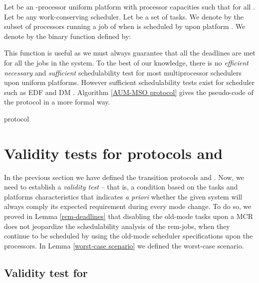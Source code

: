 \documentclass[10pt,english,a4paper]{article}
\newtheorem{validity test}{Validity Test}
\begin{document}
Let  be an -processor uniform platform with processor capacities such that  for all . Let  be any work-conserving  scheduler. Let  be a set of tasks. 
We denote by  the subset of processors running a job of  when  is scheduled by  upon platform . 
We denote by  the binary function defined by:

This function is useful as we must always guarantee that all the deadlines are met for all the jobs in the system. To the best of our knowledge, there is no {\em efficient necessary} and {\em sufficient} schedulability test for most multiprocessor schedulers upon uniform platforms. However sufficient schedulability tests exist for scheduler such as EDF and DM \cite{BaJo08_1, BaJo08_2}. Algorithm \ref{AUM-MSO protocol} gives the pseudo-code of the  protocol in a more formal way.

\begin{algorithm}
\footnotesize
{}
\caption{ protocol}
\label{AUM-MSO protocol}
\end{algorithm}

\section{Validity tests for protocols  and }
\label{sec:tests}


In the previous section we have defined the transition protocols  and . Now, we need to establish a {\em validity test} -- that is, a condition based on the tasks and platforms characteristics that indicates {\em a priori} whether the given system will always comply its expected requirement during every mode change. To do so, we proved in Lemma \ref{rem-deadlines} that disabling the old-mode tasks upon a MCR does not jeopardize the schedulability analysis of the rem-jobs, when they continue to be scheduled by using the old-mode scheduler specifications upon the  processors. In Lemma \ref{worst-case scenario} we defined the worst-case scenario. 

\subsection{Validity test for }
\end{document}
